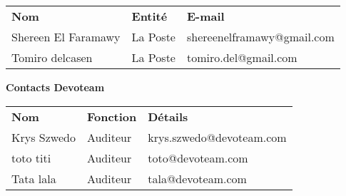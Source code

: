 { 
  {\renewcommand{\arraystretch}{2}
    { \centering

      \begin{tabular}{m{5cm}m{5cm}m{6cm}}
        \rowcolor{bharray} {\color{white}\textbf{Nom}} & {\color{white} \textbf{Entité}} & {\color{white} \textbf{E-mail}}\\
        Shereen El Faramawy & La Poste & shereenelframawy@gmail.com\\
        Tomiro delcasen & La Poste & tomiro.del@gmail.com\\
    \end{tabular} }

    \vspace{2cm}

    {\Large \textbf{Contacts Devoteam} }\\ \par
    { \centering

      \begin{tabular}{m{5cm}m{5cm}m{6cm}}
        \rowcolor{bharray} {\color{white}\textbf{Nom}} & {\color{white} \textbf{Fonction}} & {\color{white} \textbf{Détails}}\\
        Krys Szwedo & Auditeur & krys.szwedo@devoteam.com\\
        toto titi & Auditeur & toto@devoteam.com\\
        Tata lala & Auditeur & tala@devoteam.com\\
\end{tabular} }}}